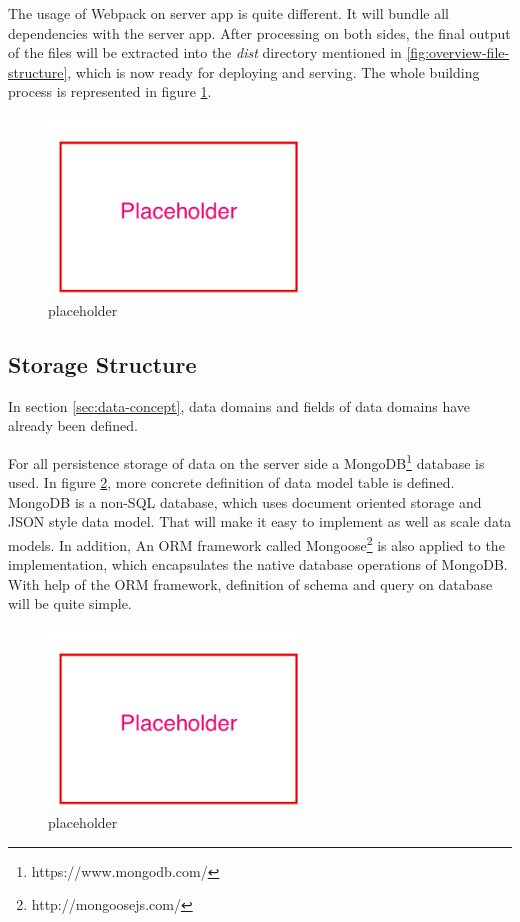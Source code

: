 The usage of Webpack on server app is quite different. It will bundle all dependencies with the server app. After processing on both sides, the final output of the files will be extracted into the \textit{dist} directory mentioned in \ref{fig:overview-file-structure}, which is now ready for deploying and serving. The whole building process is represented in figure \ref{fig:automated-building-imp}.

\begin{figure}[!htbp]
  \centering
    \includegraphics[width=0.6\textwidth]{Figures/placeholder.png}
  \caption{placeholder}
  \label{fig:automated-building-imp}
\end{figure}

\subsection{Storage Structure}
In section \ref{sec:data-concept}, data domains and fields of data domains  have already been defined. 

For all persistence storage of data on the server side a MongoDB\footnote{https://www.mongodb.com/} database is used.  In figure \ref{fig:data-model-table-imp}, more concrete definition of data model table is defined. MongoDB is a non-SQL database, which uses document oriented storage and JSON style data model. That will make it easy to implement as well as scale data models. In addition, An \gls{ORM} framework called Mongoose\footnote{http://mongoosejs.com/} is also applied to the implementation, which encapsulates the native database operations of MongoDB. With help of the \gls{ORM} framework, definition of schema and query on database will be quite simple. 


\begin{figure}[!htbp]
  \centering
    \includegraphics[width=0.6\textwidth]{Figures/placeholder.png}
  \caption{placeholder}
  \label{fig:data-model-table-imp}
\end{figure}
